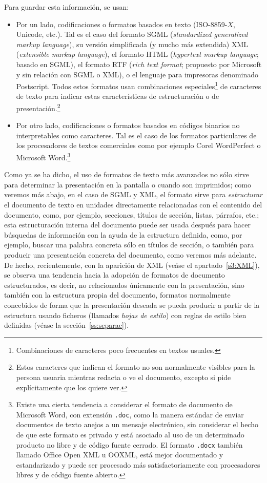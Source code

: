 Para guardar esta información, se usan: \begin{itemize} \item Por un lado, codificaciones o formatos basados en texto (ISO-8859-$X$, Unicode, etc.). Tal es el caso del formato SGML (\emph{standardized generalized markup language}), su versión simplificada (y mucho más extendida) XML (\emph{extensible markup language}), el formato HTML (\emph{hypertext markup language}; basado en SGML), el formato RTF (\emph{rich text format}; propuesto por Microsoft y sin relación con SGML o XML), o el lenguaje para impresoras denominado Postscript. Todos estos formatos usan combinaciones especiales\footnote{Combinaciones de caracteres poco frecuentes en textos usuales.} de caracteres de texto para indicar estas características de estructuración o de presentación.\footnote{Estos caracteres que indican el formato no son normalmente visibles para la persona usuaria mientras redacta o ve el documento, excepto si pide explícitamente que los quiere ver.} \item Por otro lado, codificaciones o formatos basados en códigos binarios no interpretables como caracteres. Tal es el caso de los formatos particulares de los procesadores de textos comerciales como por ejemplo Corel WordPerfect o Microsoft Word.\footnote{Existe una cierta tendencia a considerar el formato de documento de Microsoft Word, con extensión \texttt{.doc}, como la manera estándar de enviar documentos de texto anejos a un mensaje electrónico, sin considerar el hecho de que este formato es privado y está asociado al uso de un determinado producto no libre y de código fuente cerrado. El formato \texttt{.docx} también llamado Office Open XML u OOXML, está mejor documentado y estandarizado y puede ser procesado más satisfactoriamente con procesadores libres y de código fuente abierto.} \end{itemize} Como ya se ha dicho, el uso de formatos de texto más avanzados no sólo sirve para determinar la presentación en la pantalla o cuando son imprimidos; como veremos más abajo, en el caso de SGML y XML, el formato sirve para \emph{estructurar} el documento de texto en unidades directamente relacionadas con el contenido del documento, como, por ejemplo, secciones, títulos de sección, listas, párrafos, etc.; esta estructuración interna del documento puede ser usada después para hacer búsquedas de información con la ayuda de la estructura definida, como, por ejemplo, buscar una palabra concreta sólo en títulos de sección, o también para producir una presentación concreta del documento, como veremos más adelante. De hecho, recientemente, con la aparición de XML (veáse el apartado~\ref{s3:XML}), se observa una tendencia hacia la adopción de formatos de documento estructurados, es decir, no relacionados únicamente con la presentación, sino también con la estructura propia del documento, formatos normalmente concebidos de forma que la presentación deseada se pueda producir a partir de la estructura usando ficheros (llamados \emph{hojas de estilo}) con reglas de estilo bien definidas (véase la sección~\ref{ss:separac}). 

